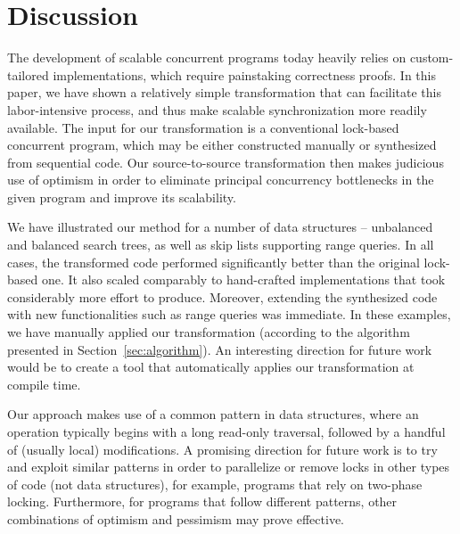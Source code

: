 \section{Discussion}\label{sec:discussion}

The development of scalable concurrent programs today
heavily relies on custom-tailored implementations, which require painstaking correctness proofs.
In this paper, we have shown a relatively simple  transformation that can facilitate this labor-intensive process, and
thus make scalable synchronization more readily available.
The input for our transformation is a conventional lock-based concurrent program, which may be either constructed manually or
synthesized from sequential code. Our source-to-source transformation then makes judicious use of optimism in order to
eliminate principal concurrency bottlenecks in the given program and improve its scalability. 

We have illustrated our method for a number of data structures -- unbalanced and balanced search trees,  as well as
skip lists supporting range queries. 
In all cases, the transformed code performed significantly better than the original
lock-based one. It also scaled comparably  to hand-crafted
implementations that took considerably more effort to produce.
Moreover, extending the synthesized code with new functionalities
such as range queries was immediate. 
In these examples, we have manually applied our transformation (according to the algorithm presented in Section~\ref{sec:algorithm}). An interesting direction for future work would be to create a tool that automatically applies our transformation at compile time.

Our approach makes use of a common pattern in data structures, where an operation typically begins with a long read-only traversal, followed by a handful of (usually local) modifications.
A promising direction for future work  is to try and
exploit similar patterns in order to parallelize or remove locks in other types of code (not data structures), for example, programs that rely on two-phase locking.
Furthermore, for programs that follow different patterns, other combinations of optimism and pessimism may prove effective.

